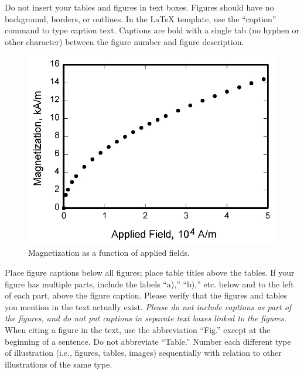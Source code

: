 \documentclass[conf]{new-aiaa}
\begin{document}
Do not insert your tables and figures in text boxes. Figures should have no background, borders, or outlines. In the \LaTeX{} template, use the ``caption'' command to type caption text. Captions are bold with a single tab (no hyphen or other character) between the figure number and figure description.



\begin{figure}[hbt!]
\centering
\includegraphics[width=.5\textwidth]{figs/graph}
\caption{Magnetization as a function of applied fields.}
\end{figure}

Place figure captions below all figures; place table titles above the tables. If your figure has multiple parts, include the labels ``a),'' ``b),'' etc. below and to the left of each part, above the figure caption. Please verify that the figures and tables you mention in the text actually exist. \emph{Please do not include captions as part of the figures, and do not put captions in separate text boxes linked to the figures.} When citing a figure in the text, use the abbreviation ``Fig.'' except at the beginning of a sentence. Do not abbreviate ``Table.'' Number each different type of illustration (i.e., figures, tables, images) sequentially with relation to other illustrations of the same type.
\end{document}

